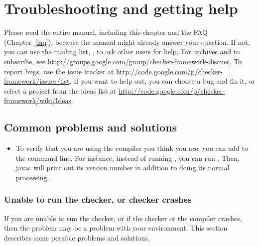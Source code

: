 \htmlhr
\chapter{Troubleshooting and getting help\label{troubleshooting}}

Please read the entire manual, including this chapter and the FAQ
(Chapter~\ref{faq}), because the manual might already answer your question.
If not, you can use the mailing list,
, to ask other users for
help.  For archives and to subscribe, see \url{http://groups.google.com/group/checker-framework-discuss}.
To report bugs, use the issue tracker at
\url{http://code.google.com/p/checker-framework/issues/list}.
If you want to help out, you can choose a bug and fix it, or select a
project from the ideas list at
\url{http://code.google.com/p/checker-framework/wiki/Ideas}.


\section{Common problems and solutions\label{common-problems}}

\begin{itemize}
\item
To verify that you are using the compiler you think you are, you can add
 to the command line.  For instance, instead of running
, you can run .  Then, javac will print out its version number in addition
to doing its normal processing.

\end{itemize}



\subsection{Unable to run the checker, or checker crashes\label{common-problems-running}}

If you are unable to run the checker, or if the checker or the compiler
crashes, then the problem may be a problem with your environment.
This section describes some possible problems and solutions.

